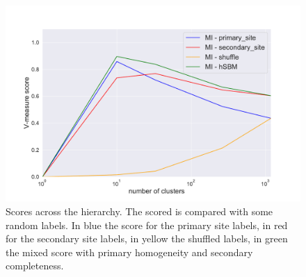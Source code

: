 \begin{figure}[htb!]
    \centering
    \includegraphics[width=0.9\linewidth]{pictures/topic/gtex/oversigma_10tissue/metric_scores_shuffle.pdf}
    \caption{Scores across the hierarchy. The scored is compared with some random labels. In blue the score for the primary site labels, in red for the secondary site labels, in yellow the shuffled labels, in green the mixed score with primary homogeneity and secondary completeness.}
    \label{fig:topic/gtex/oversigma_10tissue/metric_scores_shuffle}
\end{figure}
\FloatBarrier

